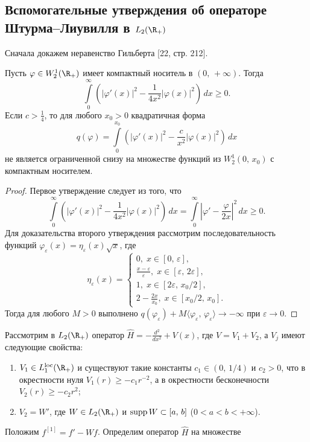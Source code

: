 \documentclass[a4paper
]{article}
\begin{document}
\subsection{Вспомогательные утверждения об операторе Штурма--Лиувилля
в $L_2(\R_+)$}
Сначала докажем неравенство Гильберта [22, стр. 212].
\begin{Sta}
\label{hilbert_ineq}
Пусть $\varphi \in W^1_2(\R_+)$ имеет компактный носитель в $(0, \, +\infty)$.
Тогда $$\int \limits_0^\infty \left(|\varphi'(x)|^2-\frac{1}{4x^2} |\varphi(x)|^2\right)
\, dx\ge 0.$$ Если $c>\frac14$, то для любого $x_0>0$ квадратичная форма $$q(\varphi)=
\int \limits_0^{x_0}\left(|\varphi'(x)|^2-\frac{c}{x^2}|\varphi(x)|^2\right)\, dx$$
не является ограниченной снизу на множестве функций из $W^1_2(0, \, x_0)$ с компактным
носителем.
\end{Sta}
\begin{proof}
Первое утверждение следует из того, что $$\int \limits_0^\infty \left(|\varphi'(x)|^2-
\frac{1}{4x^2}|\varphi(x)|^2\right)\, dx=\int \limits_0^\infty\left|\varphi'-
\frac{\varphi}{2x}\right|^2\, dx\ge 0.$$ Для доказательства второго утверждения
рассмотрим последовательность функций $\varphi_\varepsilon(x)=\eta _\varepsilon(x)\sqrt{x}$,
где $$\eta_\varepsilon(x)=\left\{ \begin{array}{l} 0, \; x\in [0, \, \varepsilon], \\
\frac{x-\varepsilon}{\varepsilon}, \; x\in [\varepsilon, \, 2\varepsilon], \\
1, \; x\in [2\varepsilon, \, x_0/2], \\ 2-\frac{2x}{x_0}, \; x\in [x_0/2, \, x_0].
\end{array}\right.$$ Тогда для любого $M>0$ выполнено $q(\varphi_\varepsilon)+M\langle
\varphi _\varepsilon , \, \varphi _\varepsilon\rangle\rightarrow -\infty$ при
$\varepsilon \rightarrow 0$.
\end{proof}
Рассмотрим в $L_2(\R_+)$ оператор $\hat
H=-\frac{d^2}{dx^2}+V(x)$, где $V=V_1+V_2$, а $V_j$ имеют
следующие свойства:
\begin{enumerate}
\item $V_1\in L_1^{{\rm loc}}(\R_+)$ и существуют такие константы
$c_1\in (0, \, 1/4)$ и $c_2>0$, что в окрестности нуля
$V_1(r)\ge -c_1r^{-2}$, а в окрестности бесконечности $V_2(r)\ge
-c_2r^2$;
\item $V_2=W'$, где $W\in L_2(\R_+)$ и ${\rm supp}\, W\subset [a, \, b]$
($0<a<b<+\infty$).
\end{enumerate}
Положим $f^{[1]}=f'-Wf$. Определим оператор $\hat H$ на множестве
\end{document}
